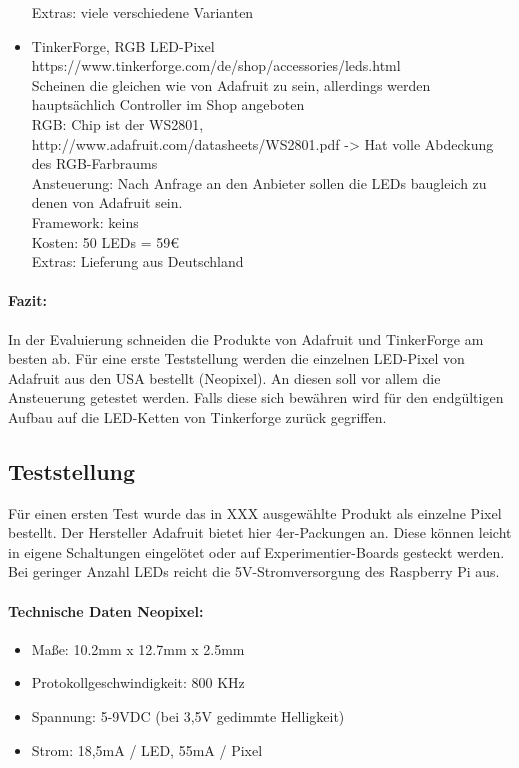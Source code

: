 \documentclass[12pt,a4paper]{scrreprt}
\begin{document}
\begin{itemize}
Extras: viele verschiedene Varianten
\item TinkerForge, RGB LED-Pixel \\
https://www.tinkerforge.com/de/shop/accessories/leds.html \\
Scheinen die gleichen wie von Adafruit zu sein, allerdings werden hauptsächlich Controller im Shop angeboten \\
RGB: Chip ist der WS2801, http://www.adafruit.com/datasheets/WS2801.pdf -> Hat volle Abdeckung des RGB-Farbraums \\
Ansteuerung: Nach Anfrage an den Anbieter sollen die LEDs baugleich zu denen von Adafruit sein.  \\
Framework: keins \\
Kosten: 50 LEDs = 59€ \\
Extras: Lieferung aus Deutschland
\end{itemize}
\paragraph{Fazit:}
In der Evaluierung schneiden die Produkte von Adafruit und TinkerForge am besten ab. Für eine erste Teststellung werden die einzelnen LED-Pixel von Adafruit aus den USA bestellt (Neopixel). An diesen soll vor allem die Ansteuerung getestet werden. Falls diese sich bewähren wird für den endgültigen Aufbau auf die LED-Ketten von Tinkerforge zurück gegriffen. 

\subsection{Teststellung}
Für einen ersten Test wurde das in XXX ausgewählte Produkt als einzelne Pixel bestellt. Der Hersteller Adafruit bietet hier 4er-Packungen an. Diese können leicht in eigene Schaltungen eingelötet oder auf Experimentier-Boards gesteckt werden. Bei geringer Anzahl LEDs reicht die 5V-Stromversorgung des Raspberry Pi aus. 
\paragraph{Technische Daten Neopixel:} 
	\begin{itemize}
	\item Maße: 10.2mm x 12.7mm x 2.5mm
	\item Protokollgeschwindigkeit: 800 KHz
	\item Spannung: 5-9VDC  (bei 3,5V gedimmte Helligkeit) 
	\item Strom: 18,5mA / LED, 55mA / Pixel
	\end{itemize}
\end{document}
